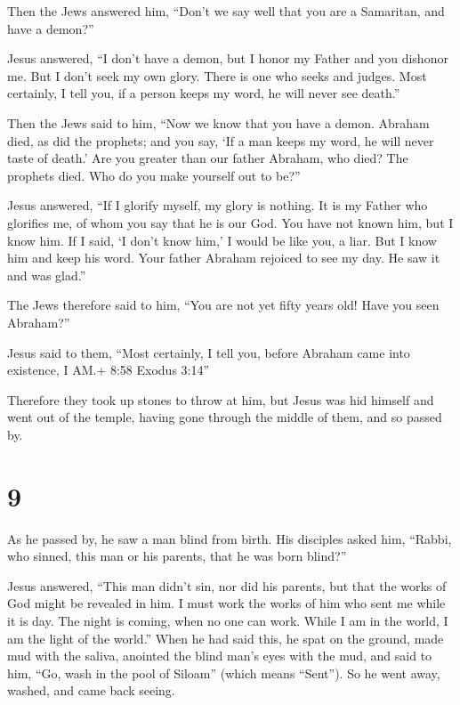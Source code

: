  Then the Jews answered him, ``Don't we say well that you
are a Samaritan, and have a demon?''

 Jesus answered, ``I don't have a demon, but I honor my
Father and you dishonor me.  But I don't seek my own glory.
There is one who seeks and judges.  Most certainly, I tell
you, if a person keeps my word, he will never see death.''

 Then the Jews said to him, ``Now we know that you have a
demon. Abraham died, as did the prophets; and you say, `If a man keeps
my word, he will never taste of death.'  Are you greater
than our father Abraham, who died? The prophets died. Who do you make
yourself out to be?''

 Jesus answered, ``If I glorify myself, my glory is
nothing. It is my Father who glorifies me, of whom you say that he is
our God.  You have not known him, but I know him. If I
said, `I don't know him,' I would be like you, a liar. But I know him
and keep his word.  Your father Abraham rejoiced to see my
day. He saw it and was glad.''

 The Jews therefore said to him, ``You are not yet fifty
years old! Have you seen Abraham?''

 Jesus said to them, ``Most certainly, I tell you, before
Abraham came into existence, I AM.+ 8:58 Exodus 3:14''

 Therefore they took up stones to throw at him, but Jesus
was hid himself and went out of the temple, having gone through the
middle of them, and so passed by.

\hypertarget{section-8}{%
\section{9}\label{section-8}}

 As he passed by, he saw a man blind from birth.
 His disciples asked him, ``Rabbi, who sinned, this man or
his parents, that he was born blind?''

 Jesus answered, ``This man didn't sin, nor did his parents,
but that the works of God might be revealed in him.  I must
work the works of him who sent me while it is day. The night is coming,
when no one can work.  While I am in the world, I am the
light of the world.''  When he had said this, he spat on the
ground, made mud with the saliva, anointed the blind man's eyes with the
mud,  and said to him, ``Go, wash in the pool of Siloam''
(which means ``Sent''). So he went away, washed, and came back seeing.

